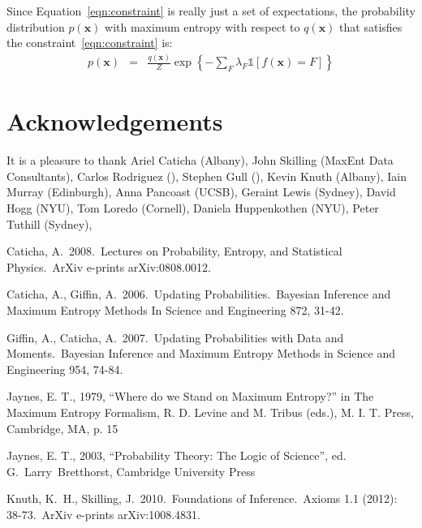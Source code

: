\documentclass[letterpaper, 11pt]{article}
\newcommand{\xx}{\boldsymbol{x}}
\begin{document}
Since Equation~\ref{eqn:constraint} is really just a set of expectations,
the probability distribution
$p(\xx)$ with maximum entropy with respect to $q(\xx)$ that satisfies the
constraint~\ref{eqn:constraint} is:
\begin{eqnarray}
p(\xx) &=& \frac{q(\xx)}{Z}\exp\left\{-\sum_F \lambda_F \mathds{1}
\left[f(\xx) = F\right]  \right\}
\end{eqnarray}


\section*{Acknowledgements}
It is a pleasure to thank
Ariel Caticha (Albany),
John Skilling (MaxEnt Data Consultants),
Carlos Rodriguez (),
Stephen Gull (),
Kevin Knuth (Albany),
Iain Murray (Edinburgh),
Anna Pancoast (UCSB),
Geraint Lewis (Sydney),
David Hogg (NYU),
Tom Loredo (Cornell),
Daniela Huppenkothen (NYU),
Peter Tuthill (Sydney),


\begin{thebibliography}{}
 Caticha, A.\ 2008.\ Lectures 
on Probability, Entropy, and Statistical Physics.\ ArXiv e-prints 
arXiv:0808.0012. 

 Caticha, A., 
Giffin, A.\ 2006.\ Updating Probabilities.\ Bayesian Inference and Maximum 
Entropy Methods In Science and Engineering 872, 31-42.

 Giffin, A., 
Caticha, A.\ 2007.\ Updating Probabilities with Data and Moments.\ Bayesian 
Inference and Maximum Entropy Methods in Science and Engineering 954, 
74-84.

 Jaynes, E. T., 1979, ``Where do we Stand on Maximum Entropy?'' in The Maximum Entropy Formalism, R. D. Levine and M. Tribus (eds.), M. I. T. Press, Cambridge, MA, p. 15

 Jaynes, E. T., 2003, ``Probability Theory:
The Logic of Science'', ed. G.~Larry~Bretthorst, Cambridge University Press

 Knuth, K.~H., 
Skilling, J.\ 2010.\ Foundations of Inference.\
Axioms 1.1 (2012): 38-73.\
ArXiv e-prints arXiv:1008.4831. 
\end{thebibliography}
\end{document}

